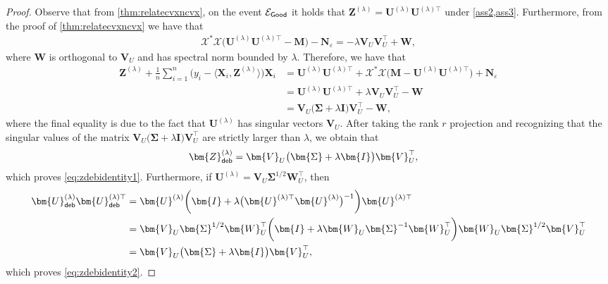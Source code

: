 \documentclass[10pt]{article}
\newcommand{\eps}{\ensuremath{\varepsilon}}
\newcommand{\s}{^*}
\renewcommand{\t}{^{\top}}
\newcommand{\inv}{^{-1}}
\theoremstyle{definition}
\begin{document}
\begin{proof}
    Observe that from \cref{thm:relatecvxncvx}, on the event $\mathcal{E}_{{\sf Good}}$ it holds that $\bm{Z}^{(\lambda)} = \bm{U}^{(\lambda)} \bm{U}^{(\lambda)\top}$ under \cref{ass2,ass3}. Furthermore, from the proof of \cref{thm:relatecvxncvx}  we have that
    \begin{align}
        \mathcal{X}\s \mathcal{X} \big( \bm{U}^{(\lambda)} \bm{U}^{(\lambda)\top} - \bm{M} \big) - \bm{N}_{\eps} = - \lambda \bm{V}_U \bm{V}_U\t + \bm{W},
    \end{align}
    where $\bm{W}$ is orthogonal to $\bm{V}_U$ and has spectral norm bounded by $\lambda$.  Therefore, we have that
\begin{align}
    \bm{Z}^{(\lambda)} + \frac{1}{n} \sum_{i=1}^{n} \bigg( y_i - \langle \bm{X}_i , \bm{Z}^{(\lambda)} \rangle \bigg) \bm{X}_i &= \bm{U}^{(\lambda)} \bm{U}^{(\lambda)\top} + \mathcal{X}\s \mathcal{X} \big( \bm{M} - \bm{U}^{(\lambda)} \bm{U}^{(\lambda)\top} \big) + \bm{N}_{\eps} \\
    &= \bm{U}^{(\lambda)} \bm{U}^{(\lambda)\top} + \lambda \bm{V}_U \bm{V}_U\t - \bm{W} \\
    &= \bm{V}_U \big( \bm{\Sigma} + \lambda \bm{I}  \big) \bm{V}_U\t - \bm{W},
\end{align}
where the final equality is due to the fact that $\bm{U}^{(\lambda)}$ has singular vectors $\bm{V}_U$.  After taking the rank $r$ projection and recognizing that the singular values of the matrix $\bm{V}_U \big( \bm{\Sigma} + \lambda \bm{I} \big) \bm{V}_U\t$ are strictly larger than $\lambda$, we obtain that
\begin{align}
    \bm{Z}^{(\lambda)}_{{\sf deb}} &= \bm{V}_U \big( \bm{\Sigma} + \lambda \bm{I} \big) \bm{V}_U\t,
\end{align}
which proves \eqref{eq:zdebidentity1}.
Furthermore, if $\bm{U}^{(\lambda)} = \bm{V}_U \bm{\Sigma}^{1/2} \bm{W}_U\t$, then
    \begin{align}
        \bm{U}^{(\lambda)}_{{\sf deb}} \bm{U}^{(\lambda)\top}_{{\sf deb}} &= \bm{U}^{(\lambda)} \bigg( \bm{I} + \lambda \big( \bm{U}^{(\lambda)\top} \bm{U}^{(\lambda)} \big)\inv \bigg)  \bm{U}^{(\lambda)\top} \\
        &= \bm{V}_U \bm{\Sigma}^{1/2} \bm{W}_U\t \bigg(   \bm{I} + \lambda \bm{W}_U \bm{\Sigma}^{-1} \bm{W}_U\t \bigg) \bm{W}_U \bm{\Sigma}^{1/2} \bm{V}_U\t \\
        &= \bm{V}_U \big( \bm{\Sigma} + \lambda \bm{I}\big) \bm{V}_U\t,
     \end{align}
     which proves \eqref{eq:zdebidentity2}.
\end{proof}
\end{document}
